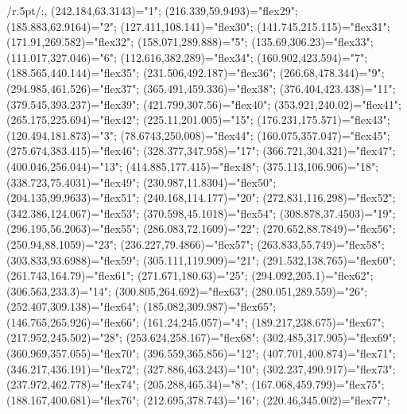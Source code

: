 
\xy /r.5pt/:,
(242.184,63.3143)="1";
(216.339,59.9493)="flex29"; %
(185.883,62.9164)="2";
(127.411,108.141)="flex30"; %
(141.745,215.115)="flex31"; %
(171.91,269.582)="flex32"; %
(158.071,289.888)="5";
(135.69,306.23)="flex33"; %
(111.017,327.046)="6";
(112.616,382.289)="flex34"; %
(160.902,423.594)="7";
(188.565,440.144)="flex35"; %
(231.506,492.187)="flex36"; %
(266.68,478.344)="9";
(294.985,461.526)="flex37"; %
(365.491,459.336)="flex38"; %
(376.404,423.438)="11";
(379.545,393.237)="flex39"; %
(421.799,307.56)="flex40"; %
(353.921,240.02)="flex41"; %
(265.175,225.694)="flex42"; %
(225.11,201.005)="15";
(176.231,175.571)="flex43"; %
(120.494,181.873)="3";
(78.6743,250.008)="flex44"; %
(160.075,357.047)="flex45"; %
(275.674,383.415)="flex46"; %
(328.377,347.958)="17";
(366.721,304.321)="flex47"; %
(400.046,256.044)="13";
(414.885,177.415)="flex48"; %
(375.113,106.906)="18";
(338.723,75.4031)="flex49"; %
(230.987,11.8304)="flex50"; %
(204.135,99.9633)="flex51"; %
(240.168,114.177)="20";
(272.831,116.298)="flex52"; %
(342.386,124.067)="flex53"; %
(370.598,45.1018)="flex54"; %
(308.878,37.4503)="19";
(296.195,56.2063)="flex55"; %
(286.083,72.1609)="22";
(270.652,88.7849)="flex56"; %
(250.94,88.1059)="23";
(236.227,79.4866)="flex57"; %
(263.833,55.749)="flex58"; %
(303.833,93.6988)="flex59"; %
(305.111,119.909)="21";
(291.532,138.765)="flex60"; %
(261.743,164.79)="flex61"; %
(271.671,180.63)="25";
(294.092,205.1)="flex62"; %
(306.563,233.3)="14";
(300.805,264.692)="flex63"; %
(280.051,289.559)="26";
(252.407,309.138)="flex64"; %
(185.082,309.987)="flex65"; %
(146.765,265.926)="flex66"; %
(161.24,245.057)="4";
(189.217,238.675)="flex67"; %
(217.952,245.502)="28";
(253.624,258.167)="flex68"; %
(302.485,317.905)="flex69"; %
(360.969,357.055)="flex70"; %
(396.559,365.856)="12";
(407.701,400.874)="flex71"; %
(346.217,436.191)="flex72"; %
(327.886,463.243)="10";
(302.237,490.917)="flex73"; %
(237.972,462.778)="flex74"; %
(205.288,465.34)="8";
(167.068,459.799)="flex75"; %
(188.167,400.681)="flex76"; %
(212.695,378.743)="16";
(220.46,345.002)="flex77"; %
